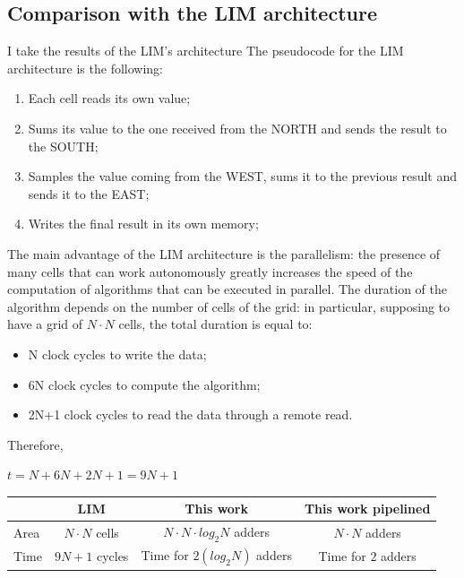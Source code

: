 \subsection{Comparison with the LIM architecture}
I take the results of the LIM's architecture
 The pseudocode for the LIM architecture is the following:
 \begin{enumerate}
 	\item Each cell reads its own value;
 	\item Sums its value to the one received from the NORTH and sends the result to the SOUTH;
 	\item Samples the value coming from the WEST, sums it to the previous result and sends it to the EAST;
 	\item Writes the final result in its own memory;
\end{enumerate}
 The main advantage of the LIM architecture is the parallelism: the presence of many cells that can work autonomously greatly increases the speed of the computation of algorithms that can be executed in parallel.
  The duration of the algorithm depends on the number of cells of the grid: in particular, supposing to have a grid of $ N \cdot N  $ cells, the total duration is equal to:
  \begin{itemize}
  	\item N clock cycles to write the data; 
  	\item 6N clock cycles to compute the algorithm; 
  	\item 2N+1 clock cycles to read the data through a remote read.   	
  \end{itemize} 
  Therefore,
  \begin{center}
  	$ t = N +6N +2N +1=9N +1 $
  \end{center}
  
  	 \begin{center}
  	 	\begin{tabular}{ | p{1.7cm} | c | c | c |}
  	 		
  	 		\hline
  	 		\label{table:iia2_tab} & LIM & This work & This work pipelined\\
  	 		\hline
  	 		Area & $ N\cdotp N$ cells  &  $ N\cdotp N\cdotp log_2 N $ adders  & $ N\cdotp N $ adders\\
  	 		\hline
  	 		Time & $ 9N +1  $ cycles
  	 		&
  	 		Time for $ 2(log_2 N) $ adders &Time for $ 2 $ adders\\
  	 		
  	 		\hline
  	 		
  	 	\end{tabular}
  	 \end{center}
